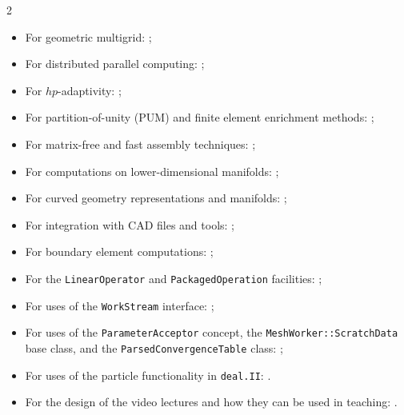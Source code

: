 \documentclass{ansarticle-preprint}
\newcommand{\specialword}[1]{\texttt{#1}}
\newcommand{\dealii}{{\specialword{deal.II}}\xspace}
\begin{document}
\begin{multicols}{2}
  \vspace*{-36pt}
  \begin{itemize}[leftmargin=4mm]
    \item For geometric multigrid: \cite{Kanschat2004,JanssenKanschat2011,ClevengerHeisterKanschatKronbichler2019, munch2022gc};
    \item For distributed parallel computing: \cite{BangerthBursteddeHeisterKronbichler11};
    \item For $hp$-adaptivity: \cite{BangerthKayserHerold2007,fehlingbangerth2023};
    \item For partition-of-unity (PUM) and finite element enrichment methods:
           \cite{Davydov2016};
    \item For matrix-free and fast assembly techniques:
          \cite{KronbichlerKormann2012,KronbichlerKormann2019};
    \item For computations on lower-dimensional manifolds:
          \cite{DeSimoneHeltaiManigrasso2009};
    \item For curved geometry representations and manifolds:
          \cite{HeltaiBangerthKronbichlerMola2019};
    \item For integration with CAD files and tools:
          \cite{HeltaiMola2015};
    \item For boundary element computations:
          \cite{GiulianiMolaHeltai-2018-a};
    \item For the \texttt{LinearOperator} and
      \texttt{Packaged\-Operation} facilities:
          \cite{MaierBardelloniHeltai-2016-a,MaierBardelloniHeltai-2016-b};
    \item For uses of the \texttt{WorkStream} interface:
          \cite{TKB16};
    \item For uses of the \texttt{ParameterAcceptor} concept, the
          \texttt{MeshWorker::ScratchData} base class, and the
          \texttt{ParsedConvergenceTable} class:
          \cite{SartoriGiulianiBardelloni-2018-a};
    \item For uses of the particle functionality in \dealii:
      \cite{GLHPB18}.
      \item For the design of the video lectures and how they can be
        used in teaching: \cite{Zarestky2022}.
          \vfill\null
  \end{itemize}
\end{multicols}
\end{document}
